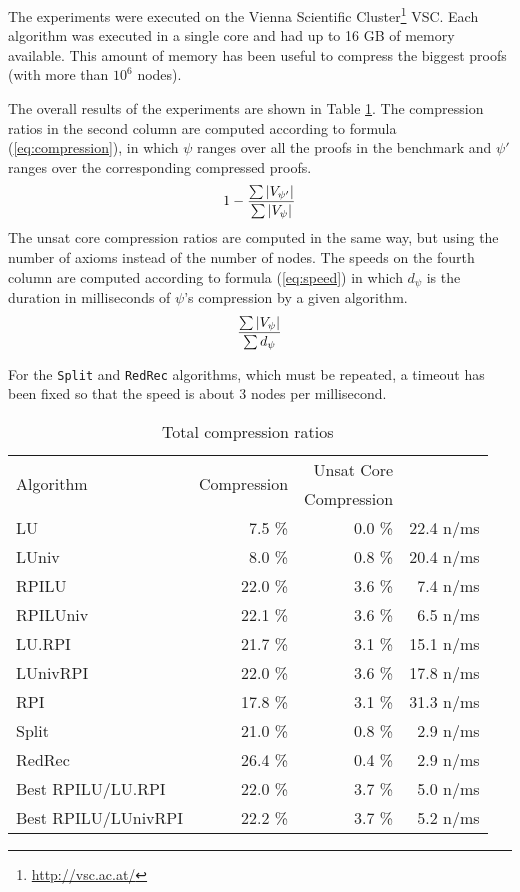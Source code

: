 \documentclass{llncs}
\begin{document}
The experiments were executed on the Vienna Scientific Cluster\footnote{\url{http://vsc.ac.at/}}
VSC. Each algorithm was executed in a single core and had up to 16 GB of memory available. This amount of memory has been useful to compress the biggest proofs (with more than $10^6$ nodes).


The overall results of the experiments are shown in Table \ref{tab:average}. The compression ratios
in the second column are computed according to formula (\ref{eq:compression}), in which $\psi$
ranges over all the proofs in the benchmark and $\psi'$ ranges over the corresponding compressed
proofs.
\begin{equation} \label{eq:compression}
  1 - \frac{ \sum {|V_{\psi'}|} }{ \sum {|V_{\psi}|} }
\end{equation}
The unsat core compression ratios are computed in the same way, but using the number of axioms instead of
the number of nodes. The speeds on the fourth column are computed according to formula
(\ref{eq:speed}) in which $d_{\psi}$ is the duration in milliseconds of $\psi$'s compression by a
given algorithm.
\begin{equation} \label{eq:speed}
  \frac{ \sum {|V_{\psi}|} }{ \sum {d_{\psi}} }
\end{equation}

For the \texttt{Split} and \texttt{RedRec} algorithms, which must be repeated, a timeout has
been fixed so that the speed is about 3 nodes per millisecond. 


\begin{table}[tb]
  \caption{Total compression ratios}
  \label{tab:average}
  \centering
  \begin{tabular}{lrrr}
    \toprule
    \multirow{2}{*}{Algorithm} & \multirow{2}{*}{Compression} & Unsat Core    & \phantom{.........}\multirow{2}{*}{Speed} \\
                                             &                                               & \phantom{...}Compression &        \\
    \midrule
    LU                &  7.5 \% &  0.0 \% & 22.4 n/ms \\
    LUniv             &  8.0 \% &  0.8 \% & 20.4 n/ms \\
    RPILU             & 22.0 \% &  3.6 \% &  7.4 n/ms \\
    RPILUniv          & 22.1 \% &  3.6 \% &  6.5 n/ms \\
    LU.RPI            & 21.7 \% &  3.1 \% & 15.1 n/ms \\
    LUnivRPI          & 22.0 \% &  3.6 \% & 17.8 n/ms \\
    RPI               & 17.8 \% &  3.1 \% & 31.3 n/ms \\
    Split             & 21.0 \% &  0.8 \% &  2.9 n/ms \\
    RedRec            & 26.4 \% &  0.4 \% &  2.9 n/ms \\
    Best RPILU/LU.RPI       & 22.0 \% &  3.7 \% &  5.0 n/ms \\
    Best RPILU/LUnivRPI & 22.2 \% &  3.7 \% &  5.2 n/ms \\
    \bottomrule
  \end{tabular}
\end{table}
\end{document}
